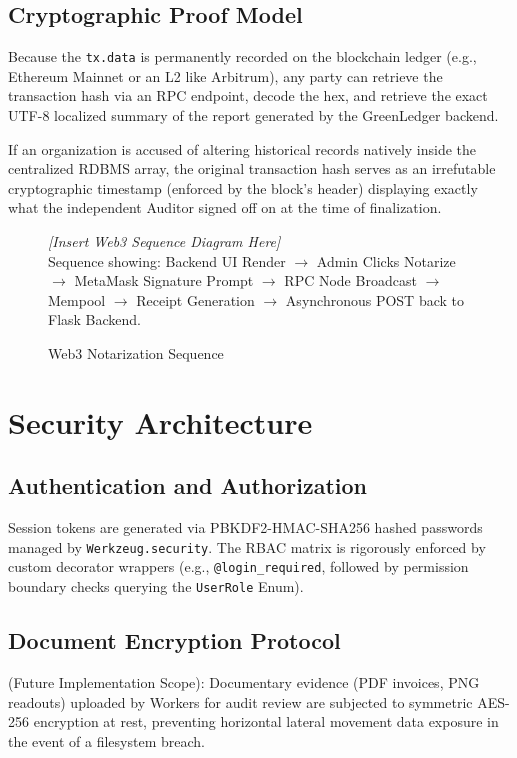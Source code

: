 \documentclass[12pt,a4paper]{article}
\begin{document}
\subsection{Cryptographic Proof Model}
Because the \texttt{tx.data} is permanently recorded on the blockchain ledger (e.g., Ethereum Mainnet or an L2 like Arbitrum), any party can retrieve the transaction hash via an RPC endpoint, decode the hex, and retrieve the exact UTF-8 localized summary of the report generated by the GreenLedger backend. 

If an organization is accused of altering historical records natively inside the centralized RDBMS array, the original transaction hash serves as an irrefutable cryptographic timestamp (enforced by the block's header) displaying exactly what the independent Auditor signed off on at the time of finalization.

\begin{figure}[H]
    \centering
    \begin{tcolorbox}[colback=blue!5!white,colframe=blue!40!black,width=0.9\textwidth,halign=center,valign=center,height=5cm]
    \textit{[Insert Web3 Sequence Diagram Here]} \\
    \vspace{0.5cm}
    \footnotesize Sequence showing: Backend UI Render $\rightarrow$ Admin Clicks Notarize $\rightarrow$ MetaMask Signature Prompt $\rightarrow$ RPC Node Broadcast $\rightarrow$ Mempool $\rightarrow$ Receipt Generation $\rightarrow$ Asynchronous POST back to Flask Backend.
    \end{tcolorbox}
    \caption{Web3 Notarization Sequence}
    \label{fig:web3seq}
\end{figure}

\section{Security Architecture}

\subsection{Authentication and Authorization}
Session tokens are generated via PBKDF2-HMAC-SHA256 hashed passwords managed by \texttt{Werkzeug.security}. The RBAC matrix is rigorously enforced by custom decorator wrappers (e.g., \texttt{@login\_required}, followed by permission boundary checks querying the \texttt{UserRole} Enum).

\subsection{Document Encryption Protocol}
(Future Implementation Scope): Documentary evidence (PDF invoices, PNG readouts) uploaded by Workers for audit review are subjected to symmetric AES-256 encryption at rest, preventing horizontal lateral movement data exposure in the event of a filesystem breach.
\end{document}
